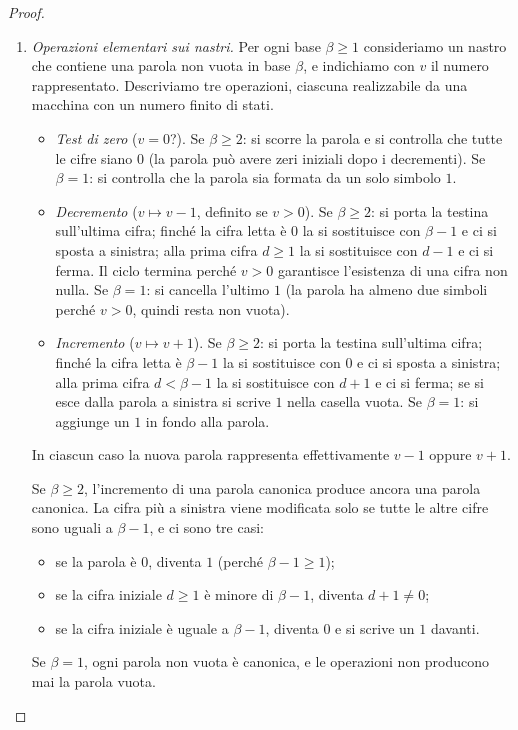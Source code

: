 \begin{prop}
\begin{proof}
\begin{enumerate}
    \item[1.] \emph{Operazioni elementari sui nastri.} Per ogni base $\beta\geq 1$ consideriamo un nastro che contiene una parola non vuota in base $\beta$, e indichiamo con $v$ il numero rappresentato. Descriviamo tre operazioni, ciascuna realizzabile da una macchina con un numero finito di stati.
    \begin{itemize}
        \item \emph{Test di zero} ($v=0$?). Se $\beta\geq 2$: si scorre la parola e si controlla che tutte le cifre siano $0$ (la parola può avere zeri iniziali dopo i decrementi). Se $\beta=1$: si controlla che la parola sia formata da un solo simbolo $1$.
        \item \emph{Decremento} ($v\mapsto v-1$, definito se $v>0$). Se $\beta\geq 2$: si porta la testina sull'ultima cifra; finché la cifra letta è $0$ la si sostituisce con $\beta-1$ e ci si sposta a sinistra; alla prima cifra $d\geq 1$ la si sostituisce con $d-1$ e ci si ferma. Il ciclo termina perché $v>0$ garantisce l'esistenza di una cifra non nulla. Se $\beta=1$: si cancella l'ultimo $1$ (la parola ha almeno due simboli perché $v>0$, quindi resta non vuota).
        \item \emph{Incremento} ($v\mapsto v+1$). Se $\beta\geq 2$: si porta la testina sull'ultima cifra; finché la cifra letta è $\beta-1$ la si sostituisce con $0$ e ci si sposta a sinistra; alla prima cifra $d<\beta-1$ la si sostituisce con $d+1$ e ci si ferma; se si esce dalla parola a sinistra si scrive $1$ nella casella vuota. Se $\beta=1$: si aggiunge un $1$ in fondo alla parola.
    \end{itemize}
    In ciascun caso la nuova parola rappresenta effettivamente $v-1$ oppure $v+1$.

    Se $\beta\geq 2$, l'incremento di una parola canonica produce ancora una parola canonica. La cifra più a sinistra viene modificata solo se tutte le altre cifre sono uguali a $\beta-1$, e ci sono tre casi:
    \begin{itemize}
        \item se la parola è $0$, diventa $1$ (perché $\beta-1\geq 1$);
        \item se la cifra iniziale $d\geq 1$ è minore di $\beta-1$, diventa $d+1\neq 0$;
        \item se la cifra iniziale è uguale a $\beta-1$, diventa $0$ e si scrive un $1$ davanti.
    \end{itemize}
    Se $\beta=1$, ogni parola non vuota è canonica, e le operazioni non producono mai la parola vuota.


\end{enumerate}
\end{proof}
\end{prop}
